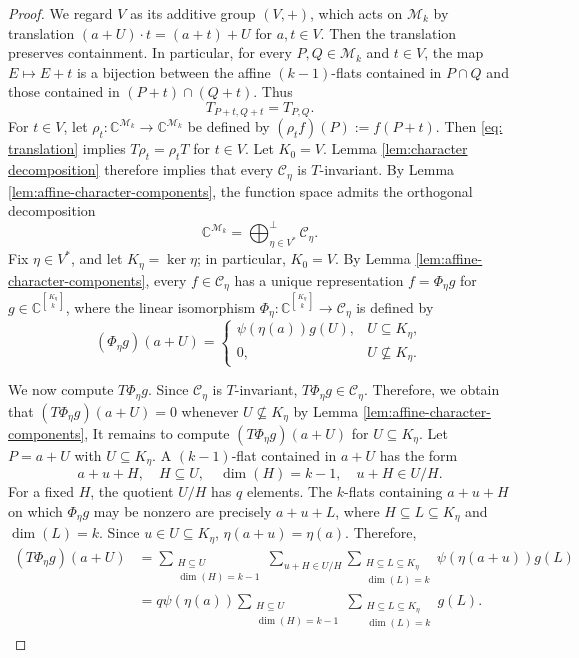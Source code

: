 \documentclass[11pt]{article}
\theoremstyle{definition}
\newcommand{\Gr}[2]{\genfrac{[}{]}{0pt}{}{#1}{#2}}
\begin{document}
\begin{proof}
We regard $V$ as its additive group $(V,+)$, which acts on $\mathcal{M}_k$ by translation $(a+U)\cdot t=(a+t)+U$ for $a,t \in V$. Then the translation preserves containment. In particular, for every $P, Q \in\mathcal{M}_k$ and $t\in V$, the map $E \mapsto E + t$ is a bijection between the affine $(k-1)$-flats contained in $P \cap Q$ and those contained in $(P + t) \cap (Q + t)$. Thus 
\begin{equation}\label{eq: translation}
    T_{P+t, Q+t} = T_{P, Q}.
\end{equation} 
For $t\in V$, let $\rho_t: \mathbb C^{\mathcal M_k} \to \mathbb C^{\mathcal M_k}$ be defined by $(\rho_t f)(P) := f(P + t)$. Then \eqref{eq: translation} implies $T \rho_t = \rho_t T$ for $t\in V$. Let $K_0=V$. Lemma \ref{lem:character decomposition} therefore implies that every $\mathcal{C}_\eta$ is $T$-invariant. By Lemma \ref{lem:affine-character-components}, the function space admits the orthogonal decomposition 
\[
\mathbb C^{\mathcal M_k}
=
\bigoplus_{\eta\in V^*}^{\perp}\mathcal C_\eta.
\]
Fix $\eta \in V^*$, and let $K_\eta=\ker \eta$; in particular, $K_0 = V$. By Lemma \ref{lem:affine-character-components}, every  
$f \in \mathcal C_\eta$ has a unique representation $f = \Phi_\eta g$ for $g \in \mathbb C^{\Gr{K_\eta}{k}}$, where the linear isomorphism
$\Phi_\eta: \mathbb{C}^{\Gr{K_\eta}{k}}\to \mathcal{C}_\eta$ is defined by
\[
(\Phi_\eta g)(a + U) = 
\begin{cases} 
\psi(\eta(a))g(U), & U \subseteq K_\eta, \\
0, & U \nsubseteq K_\eta.
\end{cases}
\]

We now compute $T\Phi_\eta g$. Since $\mathcal C_{\eta}$ is $T$-invariant, $T\Phi_{\eta}g \in \mathcal C_{\eta}$. Therefore, we obtain that $(T\Phi_{\eta}g)(a + U)=0$ whenever $U \not\subseteq K_{\eta}$ by Lemma \ref{lem:affine-character-components}, It remains to compute $(T\Phi_{\eta}g)(a + U)$ for $U \subseteq K_{\eta}$. Let $P=a+U$ with $U\subseteq K_\eta$. A $(k-1)$-flat contained in $a + U$ has the form 
\[a + u + H, \quad H \subseteq U, \quad \dim(H)= k-1, \quad u + H \in U/H.\]
For a fixed $H$, the quotient $U/H$ has $q$ elements. The $k$-flats containing $a + u + H$ on which $\Phi_\eta g$ may be nonzero are precisely $a+u+L$, where $H\subseteq L\subseteq K_\eta$ and $\dim(L) = k$. Since $u \in U \subseteq K_\eta$, $\eta(a + u) = \eta(a)$. Therefore,
\[
\begin{aligned}
    (T\Phi_\eta g)(a + U)&=\sum_{\substack{H\subseteq U \\ \dim(H) = k-1}} \sum_{u+H\in U/H} \sum_{\substack{H\subseteq L\subseteq K_\eta \\ \dim(L) = k}} \psi(\eta(a+u)) g(L)\\
    &=q \psi(\eta(a)) \sum_{\substack{H\subseteq U \\ \dim(H) = k-1}} \sum_{\substack{H\subseteq L\subseteq K_\eta \\ \dim(L)= k}} g(L).
\end{aligned}
\]


\end{proof}
\end{document}
